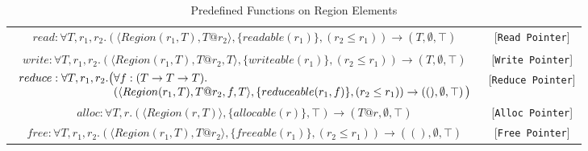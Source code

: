 \documentclass{article}
\newcommand{\rtriple}[3]{\left({#1},{#2},{#3}\right)}
\newcommand{\rsingle}[1]{\rtriple{#1}{\emptyset}{\top}}
\begin{document}
\begin{table*}
\centering
{\small
\begin{tabular}{cc}
%
% 
\begin{math}
\begin{array}{l}
read : \forall T,r_1,r_2. \rtriple{\langle Region(r_1,T), T@r_2 \rangle}{\{ readable(r_1) \}}{(r_2 \le r_1)} \rightarrow \rsingle{T}
\end{array}
\end{math} & [{\tt Read Pointer}] \\

%
%
\begin{math}
write : \forall T,r_1,r_2. \rtriple{\langle Region(r_1,T), T@r_2, T \rangle}{\{ writeable(r_1) \}}{(r_2 \le r_1)} \rightarrow \rsingle{T}
\end{math} & [{\tt Write Pointer}] \\

%
%
\begin{math}
\begin{array}{l@{}l}
reduce : \forall T,r_1,r_2. \big( & \forall f:(T \rightarrow T \rightarrow T). \\
& \rtriple{\langle Region(r_1,T), T@r_2, f, T \rangle}{\{ reduceable(r_1,f) \}}{(r_2 \le r_1)} \rightarrow \rsingle{()} \big) \end{array}
\end{math} & [{\tt Reduce Pointer}] \\

%
%
\begin{math}
alloc : \forall T,r. \rtriple{\langle Region(r,T) \rangle}{\{ allocable(r) \}}{\top} \rightarrow \rsingle{T@r}
\end{math} & [{\tt Alloc Pointer}] \\

%
%
\begin{math}
free : \forall T,r_1,r_2. \rtriple{\langle Region(r_1,T), T@r_2 \rangle}{\{ freeable(r_1) \}}{(r_2 \le r_1)} \rightarrow \rsingle{()}
\end{math} & [{\tt Free Pointer}] 

\end{tabular}
}
\caption{Predefined Functions on Region Elements}
\end{table*}
\end{document}
